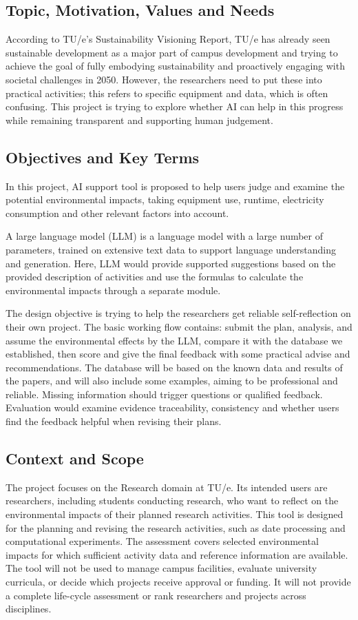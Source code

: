 \documentclass[11pt,a4paper]{article}
\begin{document}
\subsection{Topic, Motivation, Values and Needs}
According to TU/e’s Sustainability Visioning Report, TU/e has already seen sustainable development as a major part of campus development and trying to achieve the goal of fully embodying sustainability and proactively engaging with societal challenges in 2050. However, the researchers need to put these into practical activities; this refers to specific equipment and data, which is often confusing. This project is trying to explore whether AI can help in this progress while remaining transparent and supporting human judgement.

\subsection{Objectives and Key Terms}
In this project, AI support tool is proposed to help users judge and examine the potential environmental impacts, taking equipment use, runtime, electricity consumption and other relevant factors into account.

A large language model (LLM) is a language model with a large number of parameters, trained on extensive text data to support language understanding and generation. Here, LLM would provide supported suggestions based on the provided description of activities and use the formulas to calculate the environmental impacts through a separate module.

The design objective is trying to help the researchers get reliable self-reflection on their own project. The basic working flow contains: submit the plan, analysis, and assume the environmental effects by the LLM, compare it with the database we established, then score and give the final feedback with some practical advise and recommendations. The database will be based on the known data and results of the papers, and will also include some examples, aiming to be professional and reliable. Missing information should trigger questions or qualified feedback. Evaluation would examine evidence traceability, consistency and whether users find the feedback helpful when revising their plans.

\subsection{Context and Scope}

The project focuses on the Research domain at TU/e. Its intended users are researchers, including students conducting research, who want to reflect on the environmental impacts of their planned research activities. This tool is designed for the planning and revising the research activities, such as date processing and computational experiments. The assessment covers selected environmental impacts for which sufficient activity data and reference information are available.
The tool will not be used to manage campus facilities, evaluate university curricula, or decide which projects receive approval or funding. It will not provide a complete life-cycle assessment or rank researchers and projects across disciplines.
\end{document}

